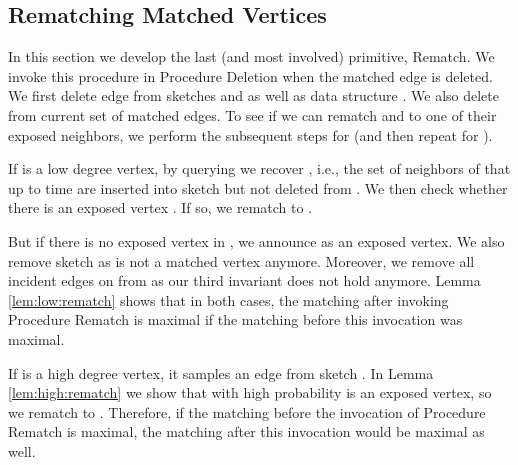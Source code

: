 \documentclass[11pt,letter]{article}
\begin{document}
\subsection{Rematching Matched Vertices}
In this section we develop the last (and most involved) primitive, {\sf Rematch}.
We invoke this procedure in Procedure {\sf Deletion} when the matched edge
 is deleted. We first delete edge  from sketches  and  as well as data structure .
We also delete  from current set  of matched edges.
To see if we can rematch  and  to one of their exposed neighbors,
we perform the subsequent steps for  (and then repeat for ).

If  is a low degree vertex, by querying  we recover , i.e.,
the set of neighbors of  that up to time 
are inserted into sketch  but not deleted from .
We then check whether there is an exposed vertex
. If so, we rematch  to .

But if there is no exposed vertex in ,
we announce  as an exposed vertex.
We also remove sketch  as  is not a matched vertex anymore. Moreover,
we remove all incident edges on  from  as our third invariant
does not hold anymore. Lemma \ref{lem:low:rematch} shows that in both cases,
the matching after invoking Procedure {\sf Rematch} is maximal
if the matching before this invocation was maximal.

If  is a high degree vertex, it samples an edge  from sketch .
In Lemma \ref{lem:high:rematch} we show that with high probability 
is an exposed vertex, so we rematch  to .
Therefore, if the matching before the invocation of
Procedure {\sf Rematch} is maximal, the matching after this
invocation would be maximal as well.

\begin{center}
\end{center}
\end{document}
